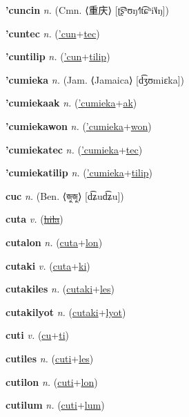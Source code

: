 \textbf{\hypertarget{'cuncin}{'cuncin}} \textit{n.} (Cmn. ⟨{\chinese{}重庆}⟩ [ʈ͡ʂʰʊŋ˧˥t͡ɕʰi˥˩ŋ])


\textbf{\hypertarget{'cuntec}{'cuntec}} \textit{n.} (\hyperlink{'cun}{'cun}+\allowbreak \hyperlink{tec}{tec})


\textbf{\hypertarget{'cuntilip}{'cuntilip}} \textit{n.} (\hyperlink{'cun}{'cun}+\allowbreak \hyperlink{tilip}{tilip})


\textbf{\hypertarget{'cumieka}{'cumieka}} \textit{n.} (Jam. ⟨Jamaica⟩ [d͡ʒʊmiɛka])


\textbf{\hypertarget{'cumiekaak}{'cumiekaak}} \textit{n.} (\hyperlink{'cumieka}{'cumieka}+\allowbreak \hyperlink{ak}{ak})


\textbf{\hypertarget{'cumiekawon}{'cumiekawon}} \textit{n.} (\hyperlink{'cumieka}{'cumieka}+\allowbreak \hyperlink{won}{won})


\textbf{\hypertarget{'cumiekatec}{'cumiekatec}} \textit{n.} (\hyperlink{'cumieka}{'cumieka}+\allowbreak \hyperlink{tec}{tec})


\textbf{\hypertarget{'cumiekatilip}{'cumiekatilip}} \textit{n.} (\hyperlink{'cumieka}{'cumieka}+\allowbreak \hyperlink{tilip}{tilip})


\textbf{\hypertarget{cuc}{cuc}} \textit{n.} (Ben. ⟨{\bengali{}জুজু}⟩ [d͡ʑud͡ʑu])


\textbf{\hypertarget{cuta}{cuta}} \textit{v.} (\hyperlink{hila}{\sout{hila}})


\textbf{\hypertarget{cutalon}{cutalon}} \textit{n.} (\hyperlink{cuta}{cuta}+\allowbreak \hyperlink{lon}{lon})


\textbf{\hypertarget{cutaki}{cutaki}} \textit{v.} (\hyperlink{cuta}{cuta}+\allowbreak \hyperlink{ki}{ki})


\textbf{\hypertarget{cutakiles}{cutakiles}} \textit{n.} (\hyperlink{cutaki}{cutaki}+\allowbreak \hyperlink{les}{les})


\textbf{\hypertarget{cutakilyot}{cutakilyot}} \textit{n.} (\hyperlink{cutaki}{cutaki}+\allowbreak \hyperlink{lyot}{lyot})


\textbf{\hypertarget{cuti}{cuti}} \textit{v.} (\hyperlink{cu}{cu}+\allowbreak \hyperlink{ti}{ti})


\textbf{\hypertarget{cutiles}{cutiles}} \textit{n.} (\hyperlink{cuti}{cuti}+\allowbreak \hyperlink{les}{les})


\textbf{\hypertarget{cutilon}{cutilon}} \textit{n.} (\hyperlink{cuti}{cuti}+\allowbreak \hyperlink{lon}{lon})


\textbf{\hypertarget{cutilum}{cutilum}} \textit{n.} (\hyperlink{cuti}{cuti}+\allowbreak \hyperlink{lum}{lum})


